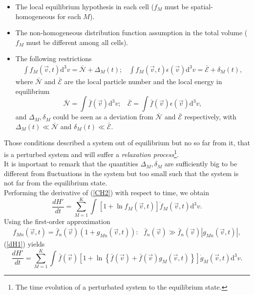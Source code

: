\documentclass{article}
\begin{document}
\begin{itemize}
    \item The local equilibrium hypothesis in each cell ($f_{M}$ must be spatial-homogeneous for each $M$).
    \item The non-homogeneous distribution function assumption in the total volume ($f_{M}$ must be different among all cells).
    \item The following restrictions
    \begin{eqnarray}
        \int f_{M}(\vec{v},t) \mathrm{d}^{3}v=\bar{\mathcal{N}}+\Delta_M(t); \ \ \ \ \int f_{M}(\vec{v},t) \epsilon(\vec{v}) \mathrm{d}^{3}v=\bar{\mathcal{E}}+ \delta_M(t), \label{restrictionoutsideclassical}
  \end{eqnarray}
  where $\bar {\mathcal{N}}$ and $\bar{\mathcal{E}}$ are the local particle number and the local energy in equilibrium
  \begin{equation}
      \bar{\mathcal{N}}= \int \bar{f}(\vec{v}) \mathrm{d}^{3}v ; \ \ \ \ \bar{\mathcal{E}}= \int \bar{f}(\vec{v})\epsilon(\vec{v}) \mathrm{d}^{3}v,
  \end{equation}
  and $\Delta_M,\delta_M$ could be seen as a deviation from $\bar{\mathcal{N}}$ and $\bar{\mathcal{E}}$ respectively, with $\Delta_M(t)\ll \bar{\mathcal{N}}$ and $\delta_M(t) \ll \bar{\mathcal{E}}$.
\end{itemize} 
 Those conditions described a system out of equilibrium but no so far from it, that is a perturbed system and will suffer a \textit{relaxation process}\footnote{The time evolution of a perturbated system to the equilibrium state.}.\\
  It is important to remark that the quantities $\Delta_M,\delta_M$ are sufficiently big to be different from fluctuations in the system but too small such that the system is not far from the equilibrium state.  \\
Performing the derivative of (\ref{CH2}) with respect to time, we obtain
\begin{equation}
    \frac{dH'}{dt}=\sum_{M=1}^{K}\int_{}^{}\left[ 1+\ln f_M(\vec{v},t) \right]\dot f_M(\vec{v},t) \mathrm{d}^3v  \label{dH1}.
\end{equation}{}
Using the first-order approximation
\begin{eqnarray}
   f_{Mn}(\vec{v},t)=\bar{f}_{n}(\vec{v})(1+g_{Mn}(\vec{v},t)): \ \ \ \bar{f}_{n}(\vec{v})\gg \bar{f}_{n}(\vec{v})|g_{Mn}(\vec{v},t)|, \label{firstorder}
\end{eqnarray}
(\ref{dH1}) yields
\begin{equation}
    \frac{dH'}{dt}=\sum_{M=1}^{K}\int_{}^{}\bar f(\vec{v}) \left [ 1+\ln \left\{ \bar f(\vec{v})+\bar f(\vec{v})g_M(\vec{v},t) \right\} \right]\dot g_M(\vec{v},t)\mathrm{d}^3v  \label{dH1,1}.
\end{equation}
\end{document}
